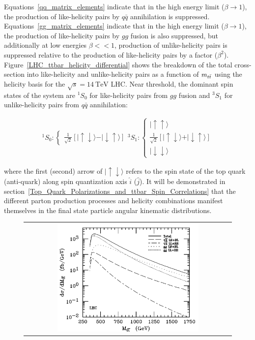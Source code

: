 \begin{refsection}
Equations~\ref{qq_matrix_elements} indicate that in the high energy limit ($\beta \rightarrow 1$), the production of like-helicity \ttbar pairs by $q\bar{q}$ annihilation is suppressed.
Equations~\ref{gg_matrix_elements} indicate that in the high energy limit ($\beta \rightarrow 1$), the production of like-helicity \ttbar pairs by $gg$ fusion is also suppressed, but additionally at low energies $\beta << 1$, production of unlike-helicity \ttbar pairs is suppressed relative to the production of like-helicity pairs by a factor ($\beta^2$).
Figure~\ref{LHC_ttbar_helicity_differential} shows the breakdown of the total \ttbar cross-section into like-helicity and unlike-helicity pairs as a function of $m_{t\bar{t}}$ using the helicity basis for the $\sqrt{s}=\SI{14}{\TeV}$ LHC.
Near threshold, the dominant spin states of the \ttbar system are ${}^{1}S_{0}$ for like-helicity \ttbar pairs from $gg$ fusion and ${}^{3}S_1$ for unlike-helicity \ttbar pairs from $q\bar{q}$ annihilation:
\begin{linenomath*}
\begin{align}
{}^{1}S_{0} :
\begin{cases}
\frac{1}{\sqrt{2}}[\vert \uparrow \downarrow \rangle - \vert \downarrow \uparrow \rangle]
\end{cases}
{}^{3}S_1 :
\begin{cases} 
\vert \uparrow \uparrow \rangle \\
\frac{1}{\sqrt{2}}[\vert \uparrow \downarrow \rangle + \vert \downarrow \uparrow \rangle] \\
\vert \downarrow \downarrow \rangle 
\end{cases}
\end{align}
\end{linenomath*}
where the first (second) arrow of $\vert \uparrow \downarrow \rangle$ refers to the spin state of the top quark (anti-quark) along spin quantization axis $\hat{i}$ ($\hat{j}$).
It will be demonstrated in section~\ref{Top_Quark_Polarizations_and_ttbar_Spin_Correlations} that the different parton production processes and helicity combinations manifest themselves in the \ttbar final state particle angular kinematic distributions.
\begin{figure}[htb]
  \begin{center}
    \begin{tabular}{c}
        \includegraphics[width=0.7\textwidth]{fig_TopQuark/LHC_ttbar_helicity_differential.png}

\end{tabular}
\end{center}
\end{figure}
\end{refsection}
